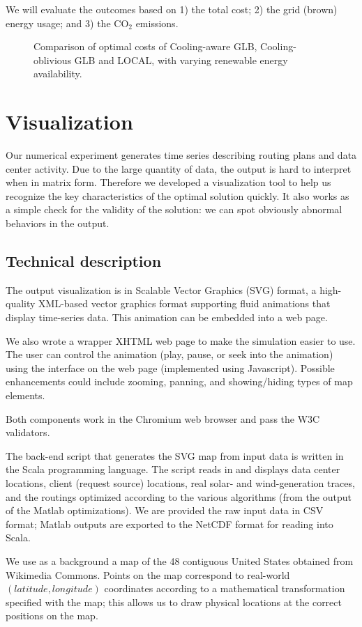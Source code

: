 \documentclass{acm_proc_article-sp}
\newcommand{\carbondioxide}{\ensuremath{\mathrm{CO}_2}}
\begin{document}
We will evaluate the outcomes based on 1) the total cost; 2) the grid (brown) energy usage; and 3) the \carbondioxide{} emissions.

\begin{figure*}
\centering
{}
\caption{Comparison of optimal costs of Cooling-aware GLB, Cooling-oblivious GLB and LOCAL, with varying renewable energy availability.}
\end{figure*}
\section{Visualization}
Our numerical experiment generates time series describing routing plans and data center activity. Due to the large quantity of data, the output is hard to interpret when in matrix form. Therefore we developed a visualization tool to help us recognize the key characteristics of the optimal solution quickly. It also works as a simple check for the validity of the solution: we can spot obviously abnormal behaviors in the output.

\subsection{Technical description}
The output visualization is in Scalable Vector Graphics (SVG) format, a high-quality XML-based vector graphics format supporting fluid animations that display time-series data. This animation can be embedded into a web page.

We also wrote a wrapper XHTML web page to make the simulation easier to use. The user can control the animation (play, pause, or seek into the animation) using the interface on the web page (implemented using Javascript). Possible enhancements could include zooming, panning, and showing/hiding types of map elements.

Both components work in the Chromium web browser and pass the W3C validators.

The back-end script that generates the SVG map from input data is written in the Scala programming language. The script reads in and displays data center locations, client (request source) locations, real solar- and wind-generation traces, and the routings optimized according to the various algorithms (from the output of the Matlab optimizations). We are provided the raw input data in CSV format; Matlab outputs are exported to the NetCDF format for reading into Scala.

We use as a background a map \cite{wikimap} of the 48 contiguous United States obtained from Wikimedia Commons. Points on the map correspond to real-world $(latitude, longitude)$ coordinates according to a mathematical transformation specified with the map; this allows us to draw physical locations at the correct positions on the map.
\end{document}
